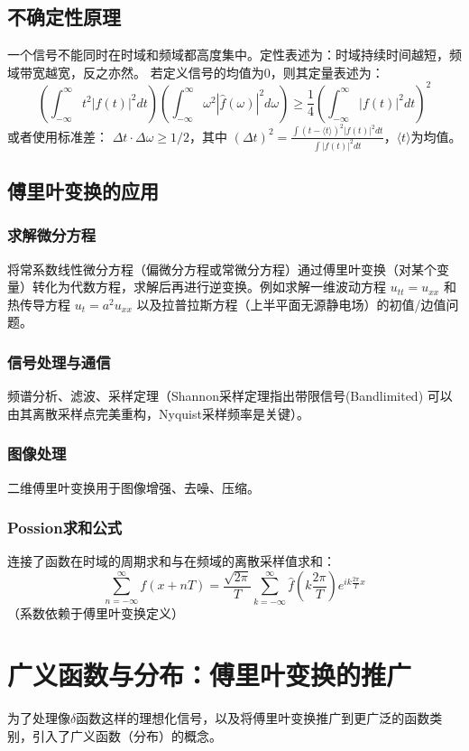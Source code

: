 \documentclass[UTF8]{ctexart}
\begin{document}
	\subsection{不确定性原理 }
	一个信号不能同时在时域和频域都高度集中。定性表述为：时域持续时间越短，频域带宽越宽，反之亦然。
	若定义信号的均值为0，则其定量表述为：
	\[ \left( \int_{-\infty}^{\infty} t^2|f(t)|^2 dt \right) \left( \int_{-\infty}^{\infty} \omega^2|\hat{f}(\omega)|^2 d\omega \right) \ge \frac{1}{4} \left( \int_{-\infty}^{\infty} |f(t)|^2 dt \right)^2 \]
	或者使用标准差： $\Delta t \cdot \Delta \omega \ge 1/2$，其中 $(\Delta t)^2 = \frac{\int (t-\langle t \rangle)^2 |f(t)|^2 dt}{\int |f(t)|^2 dt}$，$\langle t \rangle$为均值。
	
	\subsection{傅里叶变换的应用}
	\subsubsection{求解微分方程}
	将常系数线性微分方程（偏微分方程或常微分方程）通过傅里叶变换（对某个变量）转化为代数方程，求解后再进行逆变换。例如求解一维波动方程 $u_{tt} = u_{xx}$ 和热传导方程 $u_t = a^2 u_{xx}$ 以及拉普拉斯方程（上半平面无源静电场）的初值/边值问题。
	
	\subsubsection{信号处理与通信}
	频谱分析、滤波、采样定理（Shannon采样定理指出带限信号(Bandlimited) 可以由其离散采样点完美重构，Nyquist采样频率是关键）。
	
	\subsubsection{图像处理}
	二维傅里叶变换用于图像增强、去噪、压缩。
	
	\subsubsection{Possion求和公式}
	连接了函数在时域的周期求和与在频域的离散采样值求和：
	\[ \sum_{n=-\infty}^{\infty} f(x+nT) = \frac{\sqrt{2\pi}}{T} \sum_{k=-\infty}^{\infty} \hat{f}\left(k\frac{2\pi}{T}\right) e^{ik\frac{2\pi}{T}x} \]
	（系数依赖于傅里叶变换定义）
	
	
	
		\section{广义函数与分布：傅里叶变换的推广}
	为了处理像$\delta$函数这样的理想化信号，以及将傅里叶变换推广到更广泛的函数类别，引入了广义函数（分布）的概念。
	
\end{document}
